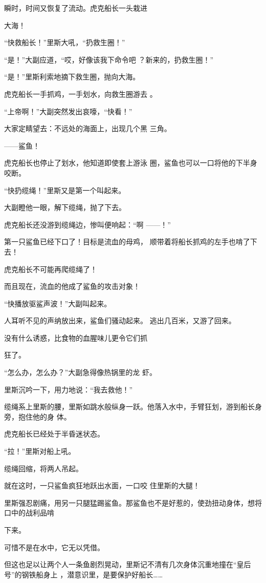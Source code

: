 \documentclass{article}
\begin{document}
瞬时，时间又恢复了流动。虎克船长一头栽进

\newpage
大海！ 


“快救船长！”里斯大吼，“扔救生圈！” 

“是！”大副应道，“哎，好像该我下命令吧
？新来的，扔救生圈！” 

“是！”里斯利索地摘下救生圈，抛向大海。

虎克船长一手抓鸡，一手划水，向救生圈游去
。 

“上帝啊！”大副突然发出哀嚎，“快看！”

大家定睛望去：不远处的海面上，出现几个黑
三角。 


——鲨鱼！ 

虎克船长也停止了划水，他知道即使套上游泳
圈，鲨鱼也可以一口将他的下半身咬断。 

\newpage


“快扔缆绳！”里斯又是第一个叫起来。 


大副瞪他一眼，解下缆绳，抛了下去。 

虎克船长还没游到缆绳边，惨叫便响起：“啊
——！” 

第一只鲨鱼已经下口了！目标是流血的母鸡，
顺带着将船长抓鸡的左手也啃了下去！ 


虎克船长不可能再爬缆绳了！ 


而且现在，流血的他成了鲨鱼的攻击对象！ 


“快播放驱鲨声波！”大副叫起来。 

人耳听不见的声纳放出来，鲨鱼们骚动起来。
逃出几百米，又游了回来。 

没有什么诱惑，比食物的血腥味儿更令它们抓

\newpage
狂了。 

“怎么办，怎么办？”大副急得像热锅里的龙
虾。 


里斯沉吟一下，用力地说：“我去救他！” 

缆绳系上里斯的腰，里斯如跳水般纵身一跃。他落入水中，手臂狂划，游到船长身旁，抱住他的身
体。 


虎克船长已经处于半昏迷状态。 


“拉！”里斯对船上吼。 


缆绳回缩，将两人吊起。 

就在这时，一只鲨鱼疯狂地跃出水面，一口咬
住里斯的大腿！ 

里斯强忍剧痛，用另一只腿猛踢鲨鱼。那鲨鱼也不是好惹的，使劲扭动身体，想将口中的战利品啃
\newpage

下来。 


可惜不是在水中，它无以凭借。 

但这也足以让两个人一条鱼剧烈晃动，里斯记不清有几次身体沉重地撞在“皇后号”的钢铁船身上
，潜意识里，是要保护好船长…… 
\end{document}

